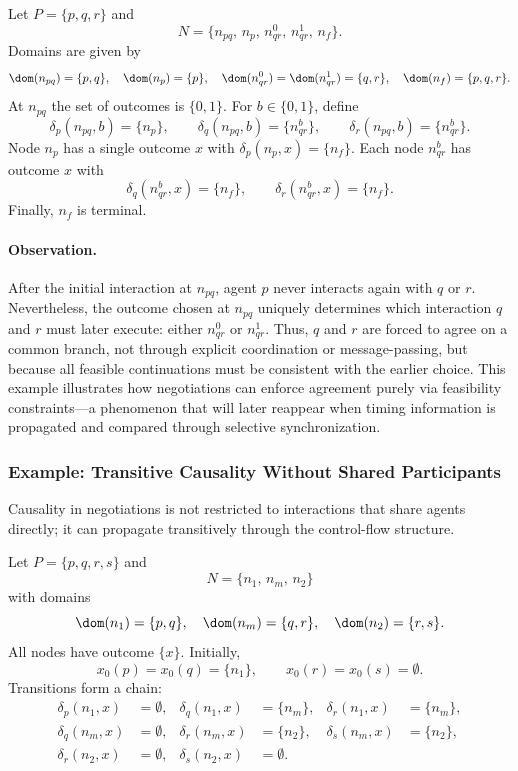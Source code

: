 \begin{example}
\label{ex:implicit-consensus}
Let $P=\{p,q,r\}$ and
\[
N=\{n_{pq},\, n_p,\, n_{qr}^0,\, n_{qr}^1,\, n_f\}.
\]
Domains are given by
\[
\dom(n_{pq})=\{p,q\},\quad \dom(n_p)=\{p\},\quad
\dom(n_{qr}^0)=\dom(n_{qr}^1)=\{q,r\},\quad \dom(n_f)=\{p,q,r\}.
\]
At $n_{pq}$ the set of outcomes is $\{0,1\}$. For $b\in\{0,1\}$, define
\[
\delta_p(n_{pq},b)=\{n_p\},\qquad
\delta_q(n_{pq},b)=\{n_{qr}^b\},\qquad
\delta_r(n_{pq},b)=\{n_{qr}^b\}.
\]
Node $n_p$ has a single outcome $x$ with $\delta_p(n_p,x)=\{n_f\}$.
Each node $n_{qr}^b$ has outcome $x$ with
\[
\delta_q(n_{qr}^b,x)=\{n_f\},\qquad
\delta_r(n_{qr}^b,x)=\{n_f\}.
\]
Finally, $n_f$ is terminal.
\end{example}

\paragraph{Observation.}
After the initial interaction at $n_{pq}$, agent $p$ never interacts again with
$q$ or $r$. Nevertheless, the outcome chosen at $n_{pq}$ uniquely determines which
interaction $q$ and $r$ must later execute: either $n_{qr}^0$ or $n_{qr}^1$.
Thus, $q$ and $r$ are forced to agree on a common branch, not through explicit
coordination or message-passing, but because all feasible continuations must be
consistent with the earlier choice. This example illustrates how negotiations can
enforce agreement purely via feasibility constraints—a phenomenon that will later
reappear when timing information is propagated and compared through selective
synchronization.

\subsubsection{Example: Transitive Causality Without Shared Participants}
\label{subsec:neg-causality-no-share}

Causality in negotiations is not restricted to interactions that share agents
directly; it can propagate transitively through the control-flow structure.

\begin{example}
\label{ex:causality-no-share}
Let $P=\{p,q,r,s\}$ and
\[
N=\{n_1,\, n_m,\, n_2\}
\]
with domains
\[
\dom(n_1)=\{p,q\},\quad \dom(n_m)=\{q,r\},\quad \dom(n_2)=\{r,s\}.
\]
All nodes have outcome $\{x\}$. Initially,
\[
x_0(p)=x_0(q)=\{n_1\},\qquad x_0(r)=x_0(s)=\emptyset.
\]
Transitions form a chain:
\begin{align*}
\delta_p(n_1,x) &= \emptyset, &
\delta_q(n_1,x) &= \{n_m\}, &
\delta_r(n_1,x) &= \{n_m\}, \\
\delta_q(n_m,x) &= \emptyset, &
\delta_r(n_m,x) &= \{n_2\}, &
\delta_s(n_m,x) &= \{n_2\}, \\
\delta_r(n_2,x) &= \emptyset, &
\delta_s(n_2,x) &= \emptyset.
\end{align*}
\end{example}

